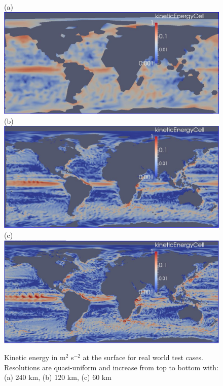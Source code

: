 \begin{figure}[H]
	\centering
(a)\includegraphics[scale=0.36]{ocean/figures/m72m_240km_yr11_k1_ke.jpg}\\
(b)\includegraphics[scale=0.36]{ocean/figures/m72g_120km_yr11_k1_ke.jpg}\\
(c)\includegraphics[scale=0.36]{ocean/figures/m72h_60km_yr11_k1_ke.jpg}
\caption{Kinetic energy in m$^2$ s$^{-2}$ at the surface for real world test cases.  Resolutions are quasi-uniform and increase from top to bottom with: (a) 240 km, (b) 120 km, (c) 60 km} 
	\label{fig:real_world_ke1}
\end{figure}


